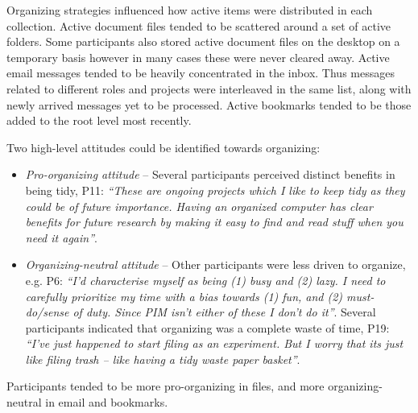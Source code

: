Organizing strategies influenced how active items were distributed in each collection.  Active document files tended to be scattered around a set of active folders.  Some participants also stored active document files on the desktop on a temporary basis however in many cases these were never cleared away. Active email messages tended to be heavily concentrated in the inbox.  Thus messages related to different roles and projects were interleaved in the same list, along with newly arrived messages yet to be processed. %
Active bookmarks tended to be those added to the root level most recently. %



Two high-level attitudes could be identified towards organizing:
\begin{itemize}

\item \textit{Pro-organizing attitude} -- Several participants perceived distinct benefits in being tidy, P11: \textit{``These are ongoing projects which I like to keep tidy as they could be of future importance. Having an organized computer has clear benefits for future research by making it easy to find and read stuff when you need it again''}.  

\item \textit{Organizing-neutral attitude} -- Other participants were less driven to organize, e.g. P6: \textit{``I'd characterise myself as being (1) busy and (2) lazy. I need to carefully prioritize my time with a bias towards (1) fun, and (2) must-do/sense of duty.  Since PIM isn't either of these I don't do it''}. Several participants indicated that organizing was a complete waste of time, P19: \textit{``I've just happened to start filing as an experiment.  But I worry that its just like filing trash -- like having a tidy waste paper basket''}.

\end{itemize}

Participants tended to be more pro-organizing in files, and more organizing-neutral in email and bookmarks.

